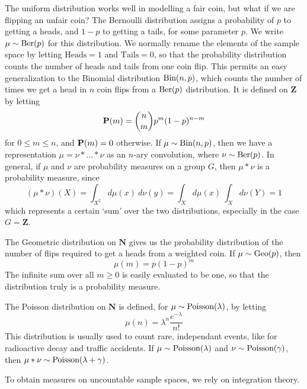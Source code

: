 \begin{example}
    The uniform distribution works well in modelling a fair coin, but what if we are flipping an unfair coin? The Bernoulli distribution assigns a probability of $p$ to getting a heads, and $1-p$ to getting a tails, for some parameter $p$. We write $\mu \sim \operatorname{\text{Ber}}(p)$ for this distribution. We normally rename the elements of the sample space by letting $\text{Heads} = 1$ and $\text{Tails} = 0$, so that the probability distribution counts the number of heads and tails from one coin flip. This permits an easy generalization to the Binomial distribution $\operatorname{\text{Bin}}(n,p)$, which counts the number of times we get a head in $n$ coin flips from a $\operatorname{\text{Ber}}(p)$ distribution. It is defined on $\mathbf{Z}$ by letting
    \[ \operatorname{\mathbf{P}}(m) = \binom{n}{m} p^m (1-p)^{n-m} \]
    for $0 \leq m \leq n$, and $\operatorname{\mathbf{P}}(m) = 0$ otherwise. If $\mu \sim \operatorname{\text{Bin}}(n,p)$, then we have a representation $\mu = \nu * \dots * \nu$ as an $n$-ary convolution, where $\nu \sim \operatorname{\text{Ber}}(p)$. In general, if $\mu$ and $\nu$ are probability measures on a group $G$, then $\mu * \nu$ is a probability measure, since
    \[ (\mu * \nu)(X) = \int_{X^2} d\mu(x)\ d\nu(y) = \int_X d\mu(x) \ \int_X d\nu(Y) = 1 \]
    which represents a certain `sum' over the two distributions, especially in the case $G = \mathbf{Z}$.
\end{example}

\begin{example}
    The Geometric distribution on $\mathbf{N}$ gives us the probability distribution of the number of flips required to get a heads from a weighted coin. If $\mu \sim \operatorname{\text{Geo}}(p)$, then
    \[ \mu(m) = p (1-p)^m \]
    The infinite sum over all $m \geq 0$ is easily evaluated to be one, so that the distribution truly is a probability measure.
\end{example}

\begin{example}
    The Poisson distribution on $\mathbf{N}$ is defined, for $\mu \sim \operatorname{\text{Poisson}}(\lambda)$, by letting
    \[ \mu(n) = \lambda^n \frac{e^{-\lambda}}{n!} \]
    This distribution is usually used to count rare, independant events, like for radioactive decay and traffic accidents. If $\mu \sim \operatorname{\text{Poisson}}(\lambda)$ and $\nu \sim \operatorname{\text{Poisson}}(\gamma)$, then $\mu * \nu \sim \operatorname{\text{Poisson}}(\lambda + \gamma)$.
\end{example}

To obtain measures on uncountable sample spaces, we rely on integration theory.


